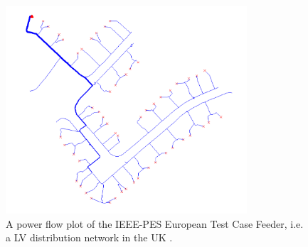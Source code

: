 \begin{figure}\centering
	\includegraphics[width=0.8\textwidth]{_chapter1/fig/network-plot-LVTestCase}
	\caption{A power flow plot of the IEEE-PES European Test Case Feeder, i.e. a LV distribution network in the UK \cite{DistributionTestFeeders2017}.}
	\label{ch1:fig:network-plot-LVTestCase}
\end{figure}